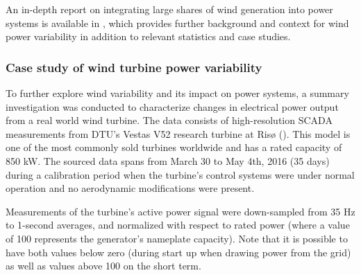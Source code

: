 An in-depth report on integrating large shares of wind generation into power systems is available in \cite{holttinen_IEA25}, which provides further background and context for wind power variability in addition to relevant statistics and case studies.

\clearpage
\subsubsection{Case study of wind turbine power variability}
\label{sec:intro_intermittency_V52}

To further explore wind variability and its impact on power systems, a summary investigation was conducted to characterize changes in electrical power output from a real world wind turbine. The data consists of high-resolution SCADA measurements from DTU's Vestas V52 research turbine at Ris{\o} (\cite{dtu_v52}). This model is one of the most commonly sold turbines worldwide and has a rated capacity of 850 kW. The sourced data spans from March 30 to May 4th, 2016 (35 days) during a calibration period when the turbine's control systems were under normal operation and no aerodynamic modifications were present. 

Measurements of the turbine's active power signal were down-sampled from 35 Hz to 1-second averages, and normalized with respect to rated power (where a value of 100 represents the generator's nameplate capacity). Note that it is possible to have both values below zero (during start up when drawing power from the grid) as well as values above 100 on the short term.

